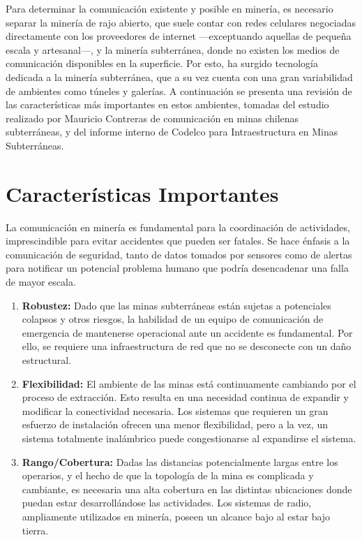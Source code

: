 Para determinar la comunicación existente y posible en minería, es necesario separar la minería de rajo abierto, que suele contar con redes celulares negociadas directamente con los proveedores de internet  ---exceptuando aquellas de pequeña escala y artesanal---, y la minería subterránea, donde no existen los medios de comunicación disponibles en la superficie. Por esto, ha surgido tecnología dedicada a la minería subterránea, que a su vez cuenta con una gran variabilidad de ambientes como túneles y galerías. A continuación se presenta una revisión de las características más importantes en estos ambientes, tomadas del estudio realizado por Mauricio Contreras \cite{tesis} de comunicación en minas chilenas subterráneas, y del informe interno de Codelco para Intraestructura en Minas Subterráneas\cite{doccodelco}.

\section{Características Importantes}

La comunicación en minería es fundamental para la coordinación de actividades, imprescindible para evitar accidentes que pueden ser fatales. Se hace énfasis a la comunicación de seguridad, tanto de datos tomados por sensores como de alertas para notificar un potencial problema humano que podría desencadenar una falla de mayor escala.

\begin{enumerate}
\item \textbf{Robustez:} Dado que las minas subterráneas están sujetas a potenciales colapsos y otros riesgos, la habilidad de un equipo de comunicación de emergencia de mantenerse operacional ante un accidente es fundamental. Por ello, se requiere una infraestructura de red que no se desconecte con un daño estructural.

\item \textbf{Flexibilidad:} El ambiente de las minas está continuamente cambiando por el proceso de extracción. Esto resulta en una necesidad continua de expandir y modificar la conectividad necesaria. Los sistemas que requieren un gran esfuerzo de instalación ofrecen una menor flexibilidad, pero a la vez, un sistema totalmente inalámbrico puede congestionarse al expandirse el sistema.

\item \textbf{Rango/Cobertura:} Dadas las distancias potencialmente largas entre los operarios, y el hecho de que la topología de la mina es complicada y cambiante, es necesaria una alta cobertura en las distintas ubicaciones donde puedan estar desarrollándose las actividades. Los sistemas de radio, ampliamente utilizados en minería, poseen un alcance bajo al estar bajo tierra.
\end{enumerate}

